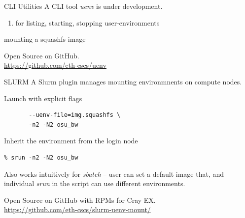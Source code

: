 \documentclass[aspectratio=43]{beamer}
\begin{document}
\begin{frame}[fragile]{CLI Utilities}
    A CLI tool \emph{uenv} is under development.
    \begin{enumerate}
    \item for listing, starting, stopping user-environments
    \end{enumerate}

    \begin{code}{mounting a squashfs image}

    \end{code}

    \vspace{10pt}

    Open Source on GitHub.\\\url{https://github.com/eth-cscs/uenv}
\end{frame}

\begin{frame}[fragile]{SLURM}
    A Slurm plugin manages mounting environmnents on compute nodes.
    \begin{code}{Launch with explicit flags}
            \begin{lstlisting}[style=talkbash]
% srun --uenv-mount=/user-environment \
       --uenv-file=img.squashfs \
       -n2 -N2 osu_bw
            \end{lstlisting}
    \end{code}
    \begin{code}{Inherit the environment from the login node}
            \begin{lstlisting}[style=talkbash]
% squashfs-mount img.squashfs /user-environment bash
% srun -n2 -N2 osu_bw
            \end{lstlisting}
    \end{code}

    Also works intuitively for \emph{sbatch} -- user can set a default image that, and individual \emph{srun} in the script can use different environments.

    Open Source on GitHub with RPMs for Cray EX.\\\url{https://github.com/eth-cscs/slurm-uenv-mount/}
\end{frame}
\end{document}
